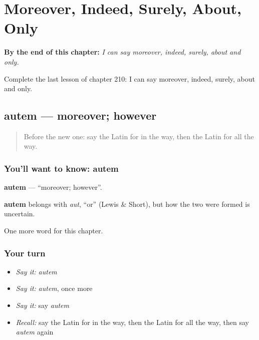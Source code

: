 
\chapter{Moreover, Indeed, Surely, About, Only}
\label{ch:la-moreover-indeed-surely-about-only}

\begin{chapteropening}
\textbf{By the end of this chapter:} \emph{I can say moreover, indeed, surely, about and only.}

Complete the last lesson of chapter 210: I can say moreover, indeed, surely, about and only.
\end{chapteropening}

\section[autem]{autem — moreover; however}

\label{lesson:LA-C210-autem}



\begin{quote}
Before the new one: say the Latin for in the way, then the Latin for all the way.
\end{quote}

\subsection*{You'll want to know: autem}
\textbf{autem} — \textquotedblleft{}moreover; however\textquotedblright{}.

\begin{cousinweb}
\textbf{autem} belongs with \emph{aut}, \textquotedblleft{}or\textquotedblright{} (Lewis \& Short), but how the two were formed is uncertain.
\end{cousinweb}

\begin{grammarlens}[title={What you've built}]
One more word for this chapter.
\end{grammarlens}

\subsection*{Your turn}
\begin{itemize}
\raggedright
  \item \emph{Say it:} \emph{autem}
  \item \emph{Say it:} \emph{autem}, once more
  \item \emph{Say it:} say \emph{autem}
  \item \emph{Recall:} say the Latin for in the way, then the Latin for all the way, then say \emph{autem} again
\end{itemize}

